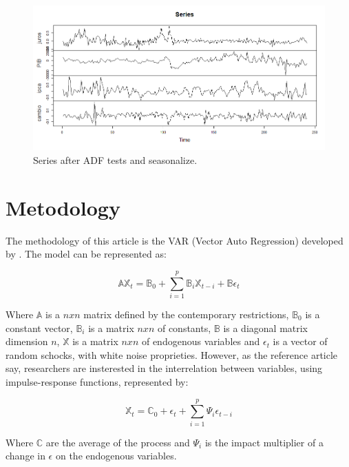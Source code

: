 \documentclass[hidelinks,12pt]{article}
\begin{document}
\begin{figure}[H]
	\centering
	\includegraphics[width=1.0\linewidth]{"../2. Dados/Rplot01"}
	\caption{Series after ADF tests and seasonalize.}
	\label{fig:rplot01}
\end{figure}



	\section{Metodology}

The methodology of this article is the VAR (Vector Auto Regression) developed by \citet{s80}. The model can be represented as:

\begin{displaymath}
	\mathbb{A} \mathbb{X}_t = \mathbb{B}_0 + \sum_{i = 1}^{p} \mathbb{B}_i \mathbb{X}_{t-i} + \mathbb{B} \epsilon_t
\end{displaymath}

Where $\mathbb{A}$ is a $nxn$ matrix defined by the contemporary restrictions, $\mathbb{B}_0$ is a constant vector, $\mathbb{B}_i$ is a matrix $nxn$ of constants, $\mathbb{B}$ is a diagonal matrix dimension $n$, $\mathbb{X}$ is a matrix $nxn$ of endogenous variables and $\epsilon_t$ is a vector of random schocks, with white noise proprieties. However, as the reference article say, researchers are insterested in the interrelation between variables, using impulse-response functions, represented by:

\begin{displaymath}
	\mathbb{X}_t = \mathbb{C}_0 + \epsilon_t + \sum_{i = 1}^{p} \Psi_i \epsilon_{t-i}
\end{displaymath}

Where $\mathbb{C}$ are the average of the process and $\Psi_i$ is the impact multiplier of a change in $\epsilon$ on the endogenous variables.\\
\end{document}
